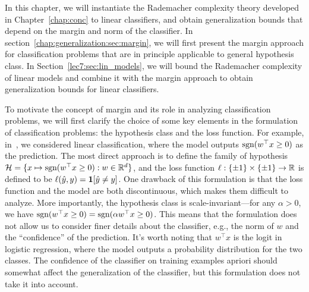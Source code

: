 


In this chapter, we will instantiate the Rademacher complexity theory developed in Chapter~\ref{chap:conc} to linear classifiers, and obtain generalization bounds that depend on the margin and norm of the classifier.  In section~\ref{chap:generalization:sec:margin}, we will first present the margin approach for classification problems that are in principle applicable to general hypothesis class. In Section~\ref{lec7:sec:lin_models}, we will bound the Rademacher complexity of linear models and combine it with the margin approach to obtain generalization bounds for linear classifiers.

 \label{chap:generalization:sec:margin}

To motivate the concept of margin and its role in analyzing classification problems, we will first clarify the choice of some key elements in the formulation of classification problems: the hypothesis class and the loss function. 
For example, in~, we considered linear classification, where the model outputs $\text{sgn}(w^\top x \ge 0)$ as the prediction. The most direct approach is to define the family of hypothesis $\mathcal H = \{x\mapsto \text{sgn}(w^\top x \ge 0): w\in \mathbb R^d\}$, and the loss function $\ell: \{\pm1\}\times \{\pm 1\}\rightarrow \mathbb R$ is defined to be $\ell(\hat{y}, y) =\mathbf{1}[\hat{y} \neq y]$. One drawback of this formulation is that  the loss function and the model are both discontinuous, which makes them difficult to analyze. More importantly, the hypothesis class is scale-invariant---for any $\alpha> 0$, we have $\text{sgn}(w^\top x \ge 0) = \text{sgn}(\alpha w^\top x \ge 0)$. This means that the formulation does not allow us to consider finer details about the classifier, e.g., the norm of $w$ and the ``confidence'' of the prediction. It's worth noting that $w^\top x$ is the logit in logistic regression, where the model outputs a probability distribution for the two classes. The confidence of the classifier on training examples apriori should somewhat affect the generalization of the classifier, but this formulation does not take it into account.

